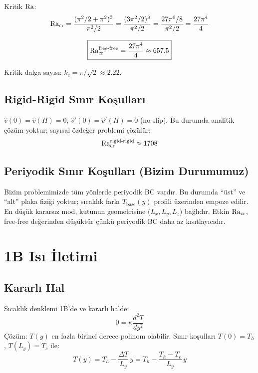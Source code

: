 Kritik $\mathrm{Ra}$:
\begin{equation}
    \mathrm{Ra}_{\text{cr}} = \frac{(\pi^2/2 + \pi^2)^3}{\pi^2/2} = \frac{(3\pi^2/2)^3}{\pi^2/2} = \frac{27\pi^6/8}{\pi^2/2} = \frac{27\pi^4}{4}
\end{equation}

\begin{equation}
    \boxed{\mathrm{Ra}_{\text{cr}}^{\text{free-free}} = \frac{27\pi^4}{4} \approx 657.5}
    \label{eq:ra_cr_free}
\end{equation}

Kritik dalga sayısı: $k_c = \pi/\sqrt{2} \approx 2.22$.

\subsection{Rigid-Rigid Sınır Koşulları}

$\hat{v}(0) = \hat{v}(H) = 0$, $\hat{v}'(0) = \hat{v}'(H) = 0$ (no-slip). Bu durumda analitik çözüm yoktur; sayısal özdeğer problemi çözülür:
\begin{equation}
    \mathrm{Ra}_{\text{cr}}^{\text{rigid-rigid}} \approx 1708
    \label{eq:ra_cr_rigid}
\end{equation}

\subsection{Periyodik Sınır Koşulları (Bizim Durumumuz)}

Bizim problemimizde tüm yönlerde periyodik BC vardır. Bu durumda ``üst'' ve ``alt'' plaka fiziği yoktur; sıcaklık farkı $T_{\text{base}}(y)$ profili üzerinden empoze edilir. En düşük kararsız mod, kutunun geometrisine ($L_x, L_y, L_z$) bağlıdır. Etkin $\mathrm{Ra}_{\text{cr}}$, free-free değerinden düşüktür çünkü periyodik BC daha az kısıtlayıcıdır.


\section{1B Isı İletimi}
\label{sec:heat_conduction}

\subsection{Kararlı Hal}

Sıcaklık denklemi 1B'de ve kararlı halde:
\begin{equation}
    0 = \kappa \frac{d^2 T}{d y^2}
\end{equation}
Çözüm: $T(y)$ en fazla birinci derece polinom olabilir. Sınır koşulları $T(0) = T_h$, $T(L_y) = T_c$ ile:
\begin{equation}
    T(y) = T_h - \frac{\Delta T}{L_y} \, y = T_h - \frac{T_h - T_c}{L_y} \, y
\end{equation}

